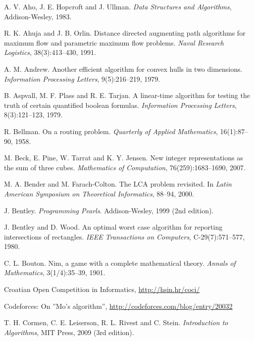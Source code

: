 \begin{thebibliography}{9}

  A. V. Aho, J. E. Hopcroft and J. Ullman.
  \emph{Data Structures and Algorithms},
  Addison-Wesley, 1983.

  R. K. Ahuja and J. B. Orlin.
  Distance directed augmenting path algorithms for maximum flow and parametric maximum flow problems.
  \emph{Naval Research Logistics}, 38(3):413--430, 1991.

  A. M. Andrew.
  Another efficient algorithm for convex hulls in two dimensions.
  \emph{Information Processing Letters}, 9(5):216--219, 1979.

  B. Aspvall, M. F. Plass and R. E. Tarjan.
  A linear-time algorithm for testing the truth of certain quantified boolean formulas.
  \emph{Information Processing Letters}, 8(3):121--123, 1979.

  R. Bellman.
  On a routing problem.
  \emph{Quarterly of Applied Mathematics}, 16(1):87--90, 1958.

  M. Beck, E. Pine, W. Tarrat and K. Y. Jensen.
  New integer representations as the sum of three cubes.
  \emph{Mathematics of Computation}, 76(259):1683--1690, 2007.

  M. A. Bender and M. Farach-Colton.
  The LCA problem revisited. In
  \emph{Latin American Symposium on Theoretical Informatics}, 88--94, 2000.

  J. Bentley.
  \emph{Programming Pearls}.
  Addison-Wesley, 1999 (2nd edition).

  J. Bentley and D. Wood.
  An optimal worst case algorithm for reporting intersections of rectangles.
  \emph{IEEE Transactions on Computers}, C-29(7):571--577, 1980.

  C. L. Bouton.
  Nim, a game with a complete mathematical theory.
  \emph{Annals of Mathematics}, 3(1/4):35--39, 1901.


  Croatian Open Competition in Informatics, \url{http://hsin.hr/coci/}

  Codeforces: On ''Mo's algorithm'',
  \url{http://codeforces.com/blog/entry/20032}

  T. H. Cormen, C. E. Leiserson, R. L. Rivest and C. Stein.
  \emph{Introduction to Algorithms}, MIT Press, 2009 (3rd edition).


\end{thebibliography}
